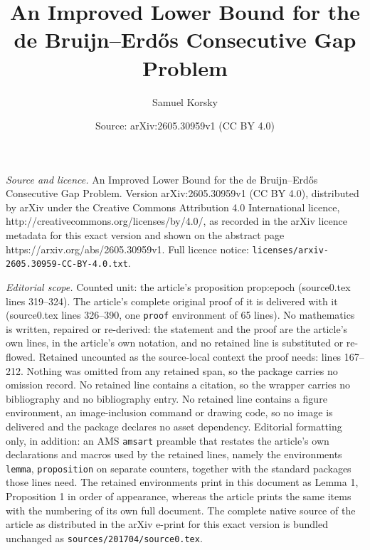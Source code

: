 \documentclass[10pt,a4paper]{amsart}
\title{An Improved Lower Bound for the de Bruijn--Erd\H{o}s Consecutive Gap Problem}
\author{Samuel Korsky}
\date{Source: arXiv:2605.30959v1 (CC BY 4.0)}
\begin{document}
\maketitle

\noindent\emph{Source and licence.} An Improved Lower Bound for the de Bruijn--Erd\H{o}s Consecutive Gap Problem. Version arXiv:2605.30959v1 (CC BY 4.0), distributed by arXiv under the Creative Commons Attribution 4.0 International licence, http://creativecommons.org/licenses/by/4.0/, as recorded in the arXiv licence metadata for this exact version and shown on the abstract page https://arxiv.org/abs/2605.30959v1. Full licence notice: \texttt{licenses/arxiv-2605.30959-CC-BY-4.0.txt}.\par\smallskip

\noindent\textit{Editorial scope.} Counted unit: the article's proposition prop:epoch (source0.tex lines 319--324). The article's complete original proof of it is delivered with it (source0.tex lines 326--390, one \texttt{proof} environment of 65 lines). No mathematics is written, repaired or re-derived: the statement and the proof are the article's own lines, in the article's own notation, and no retained line is substituted or re-flowed.  Retained uncounted as the source-local context the proof needs: lines 167--212.  Nothing was omitted from any retained span, so the package carries no omission record.  No retained line contains a citation, so the wrapper carries no bibliography and no bibliography entry.  No retained line contains a figure environment, an image-inclusion command or drawing code, so no image is delivered and the package declares no asset dependency.  Editorial formatting only, in addition: an AMS \texttt{amsart} preamble that restates the article's own declarations and macros used by the retained lines, namely the environments \texttt{lemma}, \texttt{proposition} on separate counters, together with the standard packages those lines need.  The retained environments print in this document as Lemma 1, Proposition 1 in order of appearance, whereas the article prints the same items with the numbering of its own full document.  The complete native source of the article as distributed in the arXiv e-print for this exact version is bundled unchanged as \texttt{sources/201704/source0.tex}.
\end{document}
